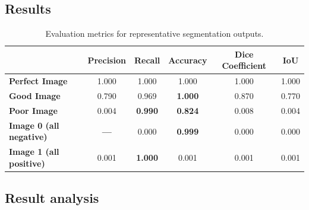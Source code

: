 \documentclass[openany, 12pt]{article}
\begin{document}
\subsection{Results}
\begin{table}[ht]
	\centering
	
	\begin{tabular}{lccccc}
		& \textbf{Precision} & \textbf{Recall} & \textbf{Accuracy} & \textbf{Dice Coefficient} & \textbf{IoU} \\
		\hline\hline
		\textbf{Perfect Image}       & 1.000 & 1.000 & 1.000 & 1.000 & 1.000 \\
		\textbf{Good Image  }        & 0.790 & 0.969 & \textbf{1.000} & 0.870 & 0.770 \\
		\textbf{Poor Image  }        & 0.004 &\textbf{ 0.990} & \textbf{0.824} & 0.008 & 0.004 \\
		\textbf{Image 0 (all negative)} &\textbf{ --- }  & 0.000 & \textbf{0.999} & 0.000 & 0.000 \\
	\textbf{Image 1 (all positive) }& 0.001 & \textbf{1.000} & 0.001 & 0.001 & 0.001 \\
	\end{tabular}
	\caption{Evaluation metrics for representative segmentation outputs. }
	\label{tab:segmentation_metrics}
\end{table}
\subsection{Result analysis}
\end{document}
